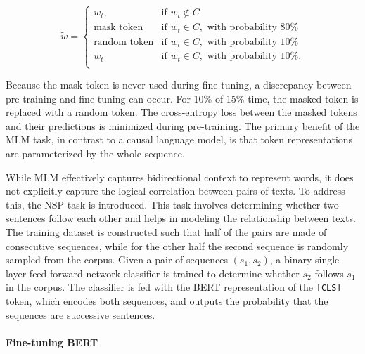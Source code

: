 \begin{equation}
    \tilde{w} = 
\begin{cases}
    w_t,               & \text{if } w_t \notin C\\
    \text{mask token}       & \text{if } w_t \in C, \text{ with probability 80\%} \\
    \text{random token}       & \text{if } w_t \in C, \text{ with probability 10\%} \\
    w_t       & \text{if } w_t \in C, \text{ with probability 10\%.} \\
\end{cases}
\end{equation}

\noindent Because the mask token is never used during fine-tuning, a discrepancy between pre-training and fine-tuning can occur. For 10\% of 15\% time, the masked token is replaced with a random token. The cross-entropy loss between the masked tokens and their predictions is minimized during pre-training. The primary benefit of the \ac{MLM} task, in contrast to a causal language model, is that token representations are parameterized by the whole sequence.

While \ac{MLM} effectively captures bidirectional context to represent words, it does not explicitly capture the logical correlation between pairs of texts. To address this, the \ac{NSP} task is introduced. This task involves determining whether two sentences follow each other and helps in modeling the relationship between texts. The training dataset is constructed such that half of the pairs are made of consecutive sequences, while for the other half the second sequence is randomly sampled from the corpus. Given a pair of sequences $(s_1, s_2)$, a binary single-layer feed-forward network classifier is trained to determine whether $s_2$ follows $s_1$ in the corpus. The classifier is fed with the \ac{BERT} representation of the \texttt{[CLS]} token, which encodes both sequences, and outputs the probability that the sequences are successive sentences. 


\paragraph{Fine-tuning BERT}

